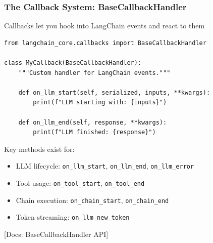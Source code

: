 \documentclass[aspectratio=169,11pt]{beamer}
\newcommand{\docref}[1]{{\scriptsize\color{docgray}[Docs: #1]}}
\begin{document}

\begin{frame}[fragile]
  \frametitle{The Callback System: BaseCallbackHandler}

  \begin{conceptbox}
    Callbacks let you hook into LangChain events and react to them
  \end{conceptbox}

  \vspace{0.15cm}

  \begin{lstlisting}
from langchain_core.callbacks import BaseCallbackHandler

class MyCallback(BaseCallbackHandler):
    """Custom handler for LangChain events."""

    def on_llm_start(self, serialized, inputs, **kwargs):
        print(f"LLM starting with: {inputs}")

    def on_llm_end(self, response, **kwargs):
        print(f"LLM finished: {response}")
  \end{lstlisting}

  \vspace{0.2cm}

  Key methods exist for:
  \begin{itemize}
    \setlength{\itemsep}{1pt}
    \item LLM lifecycle: \texttt{on\_llm\_start}, \texttt{on\_llm\_end}, \texttt{on\_llm\_error}
    \item Tool usage: \texttt{on\_tool\_start}, \texttt{on\_tool\_end}
    \item Chain execution: \texttt{on\_chain\_start}, \texttt{on\_chain\_end}
    \item Token streaming: \texttt{on\_llm\_new\_token}
  \end{itemize}

  \docref{BaseCallbackHandler API}
\end{frame}

\end{document}
